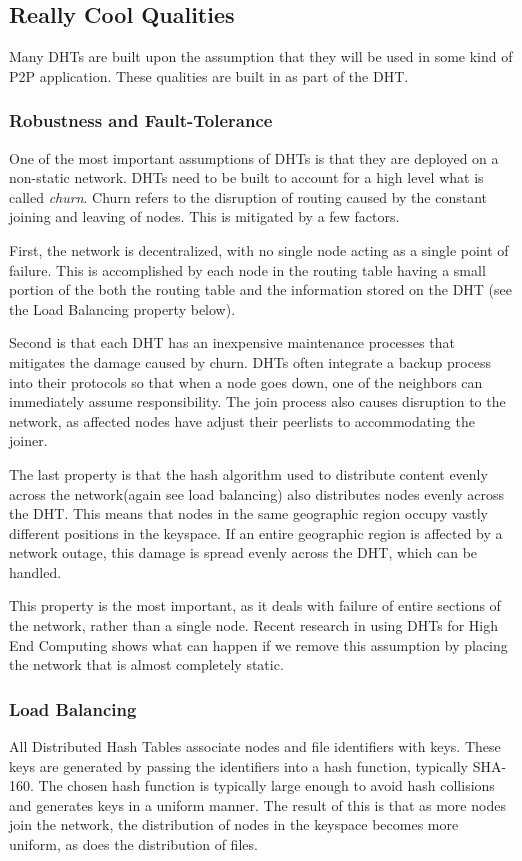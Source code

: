 \documentclass[10pt,letterpaper]{report}
\begin{document}
\subsection{Really Cool Qualities}
Many DHTs are built upon the assumption that they will be used in some kind of P2P application.
These qualities are built in as part of the DHT.
\subsubsection{Robustness and Fault-Tolerance}
One of the most important assumptions of DHTs is that they are deployed on a non-static network.
DHTs need to be built to account for a high level what is called \textit{churn}.  
Churn refers to the disruption of routing caused by the constant joining and leaving of nodes.
This is mitigated by a few factors.

First, the network is decentralized, with no single node acting as a single point of failure.
This is accomplished by each node in the routing table having a small portion of the both the routing table and the information stored on the DHT (see the Load Balancing property below).

Second is that each DHT has an inexpensive maintenance processes that mitigates the damage caused by churn.
DHTs often integrate a backup process into their protocols so that when a node goes down, one of the neighbors can immediately assume responsibility.
The join process also causes disruption to the network, as affected nodes have adjust their peerlists to accommodating the joiner. 

The last property is that the hash algorithm used to distribute content evenly across the network(again see load balancing) also distributes nodes evenly across the DHT.  
This means that nodes in the same geographic region occupy vastly different positions in the keyspace.  
If an entire geographic region is affected by a network outage, this damage is spread evenly across the DHT, which can be handled.

This property is the most important, as it deals with failure of entire sections of the network, rather than a single node.
Recent research in using DHTs for High End Computing \cite{li2013zht} shows what can happen if we remove this assumption by placing the network that is almost completely static.



\subsubsection{Load Balancing}
All Distributed Hash Tables associate nodes and file identifiers with keys.  
These keys are generated by passing the identifiers into a hash function, typically SHA-160.
The chosen hash function is typically large enough to avoid hash collisions and generates keys in a uniform manner. 
The result of this is that as more nodes join the network, the distribution of nodes in the keyspace becomes more uniform, as does the distribution of files.
\end{document}
